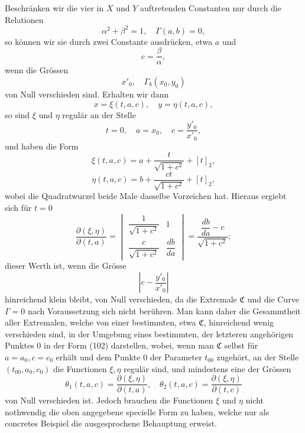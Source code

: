 \documentclass[11pt,a4paper,leqno]{article}
\begin{document}
Beschränken wir die vier in $X$ und $Y$ auftretenden Constanten nur durch die Relationen
\[
\alpha^2+\beta^2=1,
\quad
\Gamma(a,b)=0,
\]
so können wir sie durch zwei Constante ausdrücken, etwa $a$ und
\[
c=\frac{\beta}{\alpha},
\]
wenn die Grössen
\[
x'_0,
\quad
\Gamma_b(x_0,y_0)
\]
von Null verschieden sind. Erhalten wir dann
\begin{equation}\tag{102}
x=\xi(t,a,c),
\quad
y=\eta(t,a,c),
\end{equation}
so sind $\xi$ und $\eta$ regulär an der Stelle
\[
t=0,
\quad
a=x_0,
\quad
c=\frac{y'_0}{x'_0},
\]
und haben die Form
\[
\xi(t,a,c)=a+\frac{t}{\sqrt{1+c^2}}+[t]_2,
\]
\[
\eta(t,a,c)=b+\frac{ct}{\sqrt{1+c^2}}+[t]_2,
\]
wobei die Quadratwurzel beide Male dasselbe Vorzeichen hat. Hieraus ergiebt sich für $t=0$
\[
\frac{\partial(\xi,\eta)}{\partial(t,a)}=
\begin{vmatrix}
\dfrac{1}{\sqrt{1+c^2}}&1\\[1.2ex]
\dfrac{c}{\sqrt{1+c^2}}&\dfrac{db}{da}
\end{vmatrix}
=\frac{\dfrac{db}{da}-c}{\sqrt{1+c^2}};
\]
dieser Werth ist, wenn die Grösse
\[
\left|c-\frac{y'_0}{x'_0}\right|
\]
hinreichend klein bleibt, von Null verschieden, da die Extremale $\mathfrak C$ und die Curve $\Gamma=0$ nach Voraussetzung sich nicht berühren. Man kann daher die Gesammtheit aller Extremalen, welche von einer bestimmten, etwa $\mathfrak C$, hinreichend wenig verschieden sind, in der Umgebung eines bestimmten, der letzteren angehörigen Punktes 0 in der Form (102) darstellen, wobei, wenn man $\mathfrak C$ selbst für $a=a_0,c=c_0$ erhält und dem Punkte 0 der Parameter $t_{00}$ zugehört, an der Stelle $(t_{00},a_0,c_0)$ die Functionen $\xi,\eta$ regulär sind, und mindestens eine der Grössen
\[
\theta_1(t,a,c)=\frac{\partial(\xi,\eta)}{\partial(t,a)},
\quad
\theta_2(t,a,c)=\frac{\partial(\xi,\eta)}{\partial(t,c)}
\]
von Null verschieden ist. Jedoch brauchen die Functionen $\xi$ und $\eta$ nicht nothwendig die oben angegebene specielle Form zu haben, welche nur als concretes Beispiel die ausgesprochene Behauptung erweist.
\end{document}

